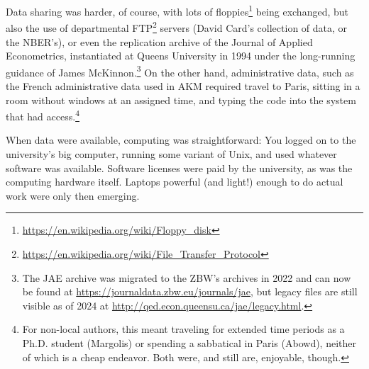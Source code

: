 \documentclass{Revue-economique}
\begin{document}
\begin{Article} [%
	Titre={Reproducibility and Open Science in Economics},
	Auteur={Lars Vilhuber\thanks{Cornell University, lars.vilhuber@cornell.edu}}]
\begin{refsection}[Main]
Data sharing was harder, of course, with lots of floppies\footnote{\url{https://en.wikipedia.org/wiki/Floppy_disk}} being exchanged, but also the use of departmental FTP\footnote{\url{https://en.wikipedia.org/wiki/File_Transfer_Protocol}} servers (David Card's collection of data, or the NBER's), or even the replication archive of the Journal of Applied Econometrics, instantiated at Queens University in 1994 under the long-running guidance of James McKinnon.\footnote{The JAE archive was migrated to the ZBW's archives in 2022 and can now be found at \url{https://journaldata.zbw.eu/journals/jae}, but legacy files are still visible as of 2024 at \url{http://qed.econ.queensu.ca/jae/legacy.html}.} On the other hand, administrative data, such as the French administrative data used in AKM required travel to Paris, sitting in a room without windows at an assigned time, and typing the code into the system that had access.\footnote{For non-local authors, this meant traveling for extended time periods as a Ph.D. student (Margolis) or spending a sabbatical in Paris (Abowd), neither of which is a cheap endeavor. Both were, and still are, enjoyable, though.}

When data were available, computing was straightforward: You logged on to the university's big computer, running some variant of Unix, and used whatever software was available. Software licenses were paid by the university, as was the computing hardware itself. Laptops powerful (and light!) enough to do actual work were only then emerging. 


\end{refsection}
\end{Article}
\end{document}
